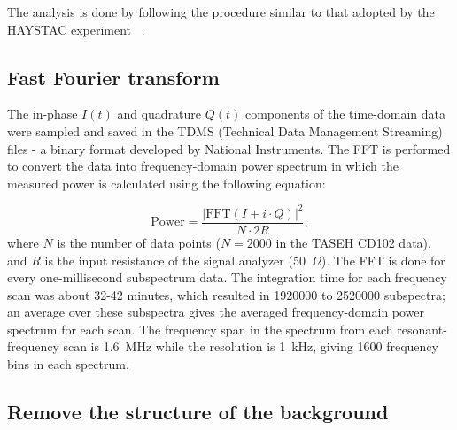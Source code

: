     The analysis is done by following the procedure similar to that 
adopted by the HAYSTAC experiment ~\cite{HAYSTACII}.

\subsection{Fast Fourier transform}
The in-phase $I(t)$ and quadrature $Q(t)$ components of the time-domain 
data were sampled and saved in the TDMS 
(Technical Data Management Streaming) files - a 
binary format developed by National Instruments.
The FFT is performed to convert the data into 
frequency-domain power spectrum in which the measured power is calculated 
using the following equation:

\begin{equation}
\label{eq:4.1}
    \text{Power} = \frac{|\text{FFT}(I+i \cdot Q)|^{2}}{N \cdot 2R},
\end{equation}
where $N$ is the number of data points ($N  = 2000$ in the TASEH 
CD102 data), and $R$ is the input resistance of the signal analyzer 
(50~$\Omega$).
The FFT is done for every one-millisecond subspectrum data. The integration 
time for each frequency scan was about 32-42 minutes, which resulted 
in 1920000 to 2520000 subspectra; an average over these subspectra gives 
the averaged frequency-domain power spectrum for each scan. 
The frequency span in the spectrum from each resonant-frequency scan is 
1.6~MHz while the 
resolution is 1~kHz, giving 1600 frequency bins in each spectrum.  

\subsection{Remove the structure of the background}

